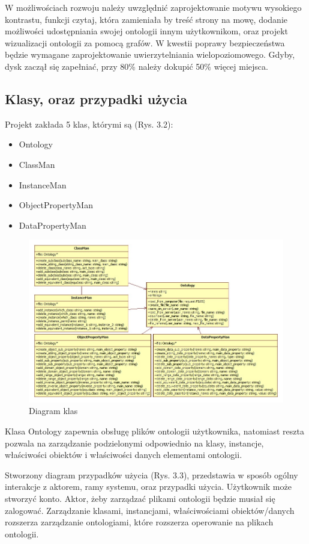 \documentclass[a4paper,12pt, twoside]{book} %
\begin{document}
W możliwościach rozwoju należy uwzględnić zaprojektowanie motywu wysokiego kontrastu, funkcji czytaj, która zamieniała by treść strony na mowę, dodanie możliwości udostępniania swojej ontologii innym użytkownikom, oraz projekt wizualizacji ontologii za pomocą grafów. W kwestii poprawy bezpieczeństwa będzie wymagane zaprojektowanie uwierzytelniania wielopoziomowego. Gdyby, dysk zaczął się zapełniać, przy 80\% należy dokupić 50\% więcej miejsca.

\subsection{Klasy, oraz przypadki użycia}

Projekt zakłada 5 klas, którymi są (Rys. 3.2):
\begin{itemize}
	\item Ontology
	\item ClassMan
	\item InstanceMan
	\item ObjectPropertyMan
	\item DataPropertyMan
\end{itemize}
\begin{figure}[h]
	\centering
	\includegraphics[scale=0.5]{klasy.jpg}
	\caption{Diagram klas}
\end{figure}
 Klasa Ontology zapewnia obsługę plików ontologii użytkownika, natomiast reszta pozwala na zarządzanie podzielonymi odpowiednio na klasy, instancje, właściwości obiektów i właściwości danych elementami ontologii.
 
   Stworzony diagram przypadków użycia (Rys. 3.3), przedstawia w sposób ogólny interakcje z aktorem, ramy systemu, oraz przypadki użycia. Użytkownik może stworzyć konto. Aktor, żeby zarządzać plikami ontologii będzie musiał się zalogować. Zarządzanie klasami, instancjami, właściwościami obiektów/danych rozszerza zarządzanie ontologiami, które rozszerza operowanie na plikach ontologii.
 
\end{document}
